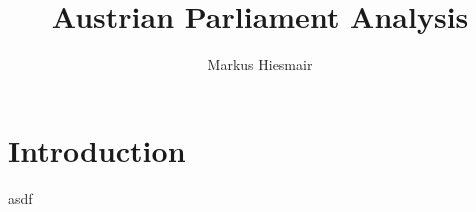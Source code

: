 \documentclass[12pt]{report}
\title{Austrian Parliament Analysis}
\author{Markus Hiesmair}
\begin{document}
\maketitle
\newpage
{}

\chapter{Introduction}
asdf
\end{document}
